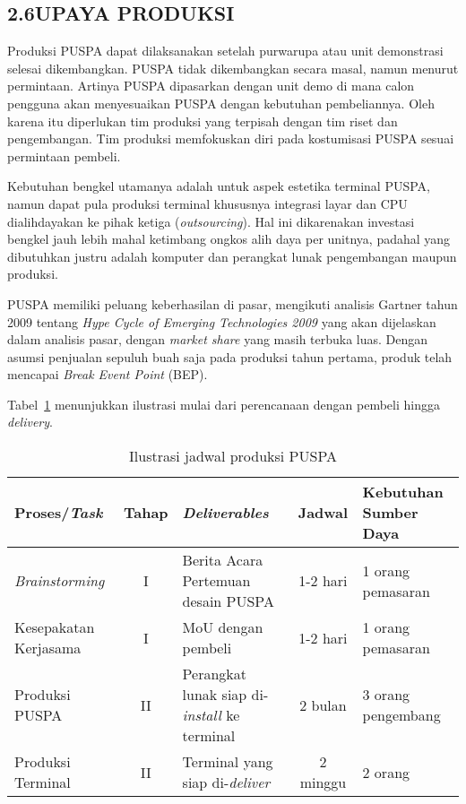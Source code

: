 \subsection*{\textsf{\normalsize 2.6\hspace{0.5cm}UPAYA PRODUKSI}}

Produksi PUSPA dapat dilaksanakan setelah purwarupa atau unit demonstrasi selesai dikembangkan. PUSPA tidak dikembangkan secara masal, namun menurut permintaan. Artinya PUSPA dipasarkan dengan unit demo di mana calon pengguna akan menyesuaikan PUSPA dengan kebutuhan pembeliannya. Oleh karena itu diperlukan tim produksi yang terpisah dengan tim riset dan pengembangan. Tim produksi memfokuskan diri pada kostumisasi PUSPA sesuai permintaan pembeli.

Kebutuhan bengkel utamanya adalah untuk aspek estetika terminal PUSPA, namun dapat pula produksi terminal khususnya integrasi layar dan CPU dialihdayakan ke pihak ketiga (\textit{outsourcing}). Hal ini dikarenakan investasi bengkel jauh lebih mahal ketimbang ongkos alih daya per unitnya, padahal yang dibutuhkan justru adalah komputer dan perangkat lunak pengembangan maupun produksi. 

PUSPA memiliki peluang keberhasilan di pasar, mengikuti analisis Gartner tahun 2009 tentang \textit{Hype Cycle of Emerging Technologies 2009} yang akan dijelaskan dalam analisis pasar, dengan \textit{market share} yang masih terbuka luas. Dengan asumsi penjualan sepuluh buah saja pada produksi tahun pertama, produk telah mencapai \textit{Break Event Point} (BEP).

Tabel~\ref{tab:ProdTime} menunjukkan ilustrasi mulai dari perencanaan dengan pembeli hingga \textit{delivery}.

\begin{table}
	\centering
		\begin{tabular}{|l|c|p{3.5cm}|c|p{3.5cm}|}
		\hline
			\textbf{Proses\slash \textit{Task}} & 		\textbf{Tahap} & \textbf{\textit{Deliverables}} & \textbf{Jadwal} & \textbf{Kebutuhan Sumber Daya}\\
		\hline
			\textit{Brainstorming} & I & Berita Acara Pertemuan desain PUSPA & 1-2 hari & 1 orang pemasaran\\
		\hline	
			Kesepakatan Kerjasama & I & MoU dengan pembeli & 1-2 hari & 1 orang pemasaran\\
		\hline
			Produksi PUSPA & II & Perangkat lunak siap di-\textit{install} ke terminal & 2 bulan & 3 orang pengembang\\
		\hline
			Produksi Terminal & II & Terminal yang siap di-\textit{deliver} & 2 minggu & 2 orang\\
		\hline
	\end{tabular}
	\caption{Ilustrasi jadwal produksi PUSPA}
	\label{tab:ProdTime}
\end{table}
